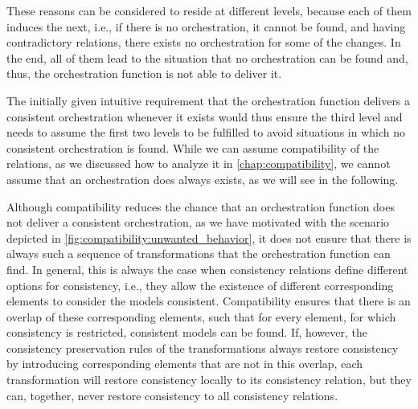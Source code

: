 These reasons can be considered to reside at different levels, because each of them induces the next, i.e., if there is no orchestration, it cannot be found, and having contradictory relations, there exists no orchestration for some of the changes.
In the end, all of them lead to the situation that no orchestration can be found and, thus, the orchestration function is not able to deliver it.

The initially given intuitive requirement that the orchestration function delivers a consistent orchestration whenever it exists would thus ensure the third level and needs to assume the first two levels to be fulfilled to avoid situations in which no consistent orchestration is found.
While we can assume compatibility of the relations, as we discussed how to analyze it in \autoref{chap:compatibility}, we cannot assume that an orchestration does always exists, as we will see in the following.

Although compatibility reduces the chance that an orchestration function does not deliver a consistent orchestration, as we have motivated with the scenario depicted in \autoref{fig:compatibility:unwanted_behavior}, it does not ensure that there is always such a sequence of transformations that the orchestration function can find.
In general, this is always the case when consistency relations define different options for consistency, i.e., they allow the existence of different corresponding elements to consider the models consistent.
Compatibility ensures that there is an overlap of these corresponding elements, such that for every element, for which consistency is restricted, consistent models can be found.
If, however, the consistency preservation rules of the transformations always restore consistency by introducing corresponding elements that are not in this overlap, each transformation will restore consistency locally to its consistency relation, but they can, together, never restore consistency to all consistency relations.

